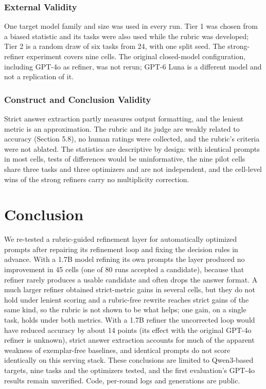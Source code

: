 \documentclass{ieeeaccess}
\begin{document}
\subsubsection{External Validity}

One target model family and size was used in every run. Tier 1 was chosen from a biased statistic and its tasks were also used while the rubric was developed; Tier 2 is a random draw of six tasks from 24, with one split seed. The strong-refiner experiment covers nine cells. The original closed-model configuration, including GPT-4o as refiner, was not rerun; GPT-6 Luna is a different model and not a replication of it.

\subsubsection{Construct and Conclusion Validity}

Strict answer extraction partly measures output formatting, and the lenient metric is an approximation. The rubric and its judge are weakly related to accuracy (Section 5.8), no human ratings were collected, and the rubric's criteria were not ablated. The statistics are descriptive by design: with identical prompts in most cells, tests of differences would be uninformative, the nine pilot cells share three tasks and three optimizers and are not independent, and the cell-level wins of the strong refiners carry no multiplicity correction.

\section{Conclusion}

We re-tested a rubric-guided refinement layer for automatically optimized prompts after repairing its refinement loop and fixing the decision rules in advance. With a 1.7B model refining its own prompts the layer produced no improvement in 45 cells (one of 80 runs accepted a candidate), because that refiner rarely produces a usable candidate and often drops the answer format. A much larger refiner obtained strict-metric gains in several cells, but they do not hold under lenient scoring and a rubric-free rewrite reaches strict gains of the same kind, so the rubric is not shown to be what helps; one gain, on a single task, holds under both metrics. With a 1.7B refiner the uncorrected loop would have reduced accuracy by about 14 points (its effect with the original GPT-4o refiner is unknown), strict answer extraction accounts for much of the apparent weakness of exemplar-free baselines, and identical prompts do not score identically on this serving stack. These conclusions are limited to Qwen3-based targets, nine tasks and the optimizers tested, and the first evaluation's GPT-4o results remain unverified. Code, per-round logs and generations are public.
\end{document}
